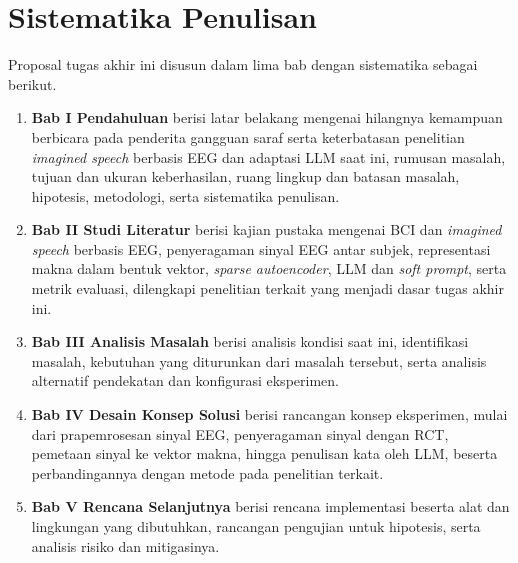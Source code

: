\section{Sistematika Penulisan}
\label{sec:sistematika}
Proposal tugas akhir ini disusun dalam lima bab dengan sistematika sebagai berikut.
\begin{enumerate}
    \item \textbf{Bab I Pendahuluan} berisi latar belakang mengenai hilangnya kemampuan berbicara pada penderita gangguan saraf serta keterbatasan penelitian \textit{imagined speech} berbasis EEG dan adaptasi LLM saat ini, rumusan masalah, tujuan dan ukuran keberhasilan, ruang lingkup dan batasan masalah, hipotesis, metodologi, serta sistematika penulisan.
    \item \textbf{Bab II Studi Literatur} berisi kajian pustaka mengenai BCI dan \textit{imagined speech} berbasis EEG, penyeragaman sinyal EEG antar subjek, representasi makna dalam bentuk vektor, \textit{sparse autoencoder}, LLM dan \textit{soft prompt}, serta metrik evaluasi, dilengkapi penelitian terkait yang menjadi dasar tugas akhir ini.
    \item \textbf{Bab III Analisis Masalah} berisi analisis kondisi saat ini, identifikasi masalah, kebutuhan yang diturunkan dari masalah tersebut, serta analisis alternatif pendekatan dan konfigurasi eksperimen.
    \item \textbf{Bab IV Desain Konsep Solusi} berisi rancangan konsep eksperimen, mulai dari prapemrosesan sinyal EEG, penyeragaman sinyal dengan RCT, pemetaan sinyal ke vektor makna, hingga penulisan kata oleh LLM, beserta perbandingannya dengan metode pada penelitian terkait.
    \item \textbf{Bab V Rencana Selanjutnya} berisi rencana implementasi beserta alat dan lingkungan yang dibutuhkan, rancangan pengujian untuk hipotesis, serta analisis risiko dan mitigasinya.
\end{enumerate}
